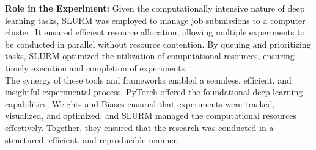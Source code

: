 \textbf{Role in the Experiment:}
Given the computationally intensive nature of deep learning tasks, SLURM was employed to manage job submissions to a computer cluster. It ensured efficient resource allocation, allowing multiple experiments to be conducted in parallel without resource contention. By queuing and prioritizing tasks, SLURM optimized the utilization of computational resources, ensuring timely execution and completion of experiments.\\

The synergy of these tools and frameworks enabled a seamless, efficient, and insightful experimental process. PyTorch offered the foundational deep learning capabilities; Weights and Biases ensured that experiments were tracked, visualized, and optimized; and SLURM managed the computational resources effectively. Together, they ensured that the research was conducted in a structured, efficient, and reproducible manner.
 
